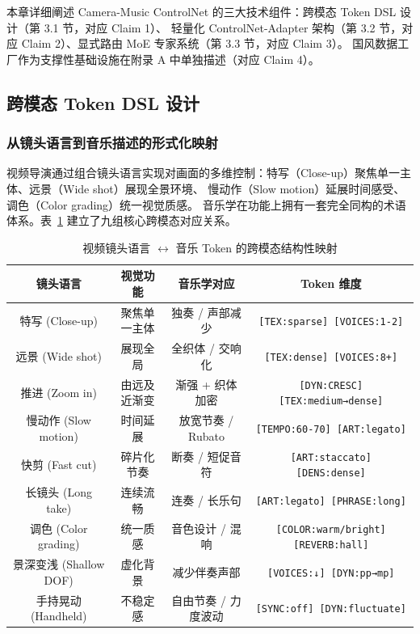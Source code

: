 \documentclass[UTF8,12pt,a4paper]{ctexart}
\begin{document}
本章详细阐述 Camera-Music ControlNet 的三大技术组件：跨模态 Token DSL 设计（第 3.1 节，对应 Claim 1）、
轻量化 ControlNet-Adapter 架构（第 3.2 节，对应 Claim 2）、显式路由 MoE 专家系统（第 3.3 节，对应 Claim 3）。
国风数据工厂作为支撑性基础设施在附录 A 中单独描述（对应 Claim 4）。

\subsection{跨模态 Token DSL 设计}

\subsubsection{从镜头语言到音乐描述的形式化映射}

视频导演通过组合镜头语言实现对画面的多维控制：特写（Close-up）聚焦单一主体、远景（Wide shot）展现全景环境、
慢动作（Slow motion）延展时间感受、调色（Color grading）统一视觉质感。
音乐学在功能上拥有一套完全同构的术语体系。表~\ref{tab:mapping} 建立了九组核心跨模态对应关系。

\begin{table}[H]
\centering
\caption{视频镜头语言 $\leftrightarrow$ 音乐 Token 的跨模态结构性映射}
\label{tab:mapping}
\begin{tabular}{c|c|c|c}
\toprule
\textbf{镜头语言} & \textbf{视觉功能} & \textbf{音乐学对应} & \textbf{Token 维度} \\
\midrule
特写 (Close-up) & 聚焦单一主体 & 独奏 / 声部减少 & \texttt{[TEX:sparse] [VOICES:1-2]} \\
远景 (Wide shot) & 展现全局 & 全织体 / 交响化 & \texttt{[TEX:dense] [VOICES:8+]} \\
推进 (Zoom in) & 由远及近渐变 & 渐强 + 织体加密 & \texttt{[DYN:CRESC] [TEX:medium→dense]} \\
慢动作 (Slow motion) & 时间延展 & 放宽节奏 / Rubato & \texttt{[TEMPO:60-70] [ART:legato]} \\
快剪 (Fast cut) & 碎片化节奏 & 断奏 / 短促音符 & \texttt{[ART:staccato] [DENS:dense]} \\
长镜头 (Long take) & 连续流畅 & 连奏 / 长乐句 & \texttt{[ART:legato] [PHRASE:long]} \\
调色 (Color grading) & 统一质感 & 音色设计 / 混响 & \texttt{[COLOR:warm/bright] [REVERB:hall]} \\
景深变浅 (Shallow DOF) & 虚化背景 & 减少伴奏声部 & \texttt{[VOICES:↓] [DYN:pp→mp]} \\
手持晃动 (Handheld) & 不稳定感 & 自由节奏 / 力度波动 & \texttt{[SYNC:off] [DYN:fluctuate]} \\
\bottomrule
\end{tabular}
\end{table}
\end{document}
